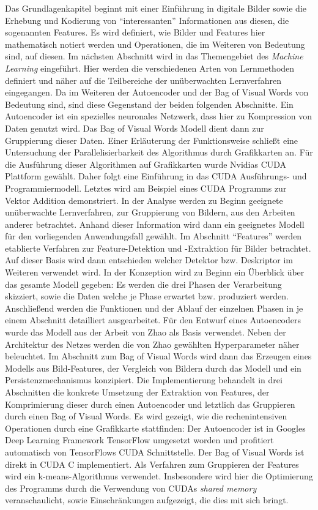 Das Grundlagenkapitel beginnt mit einer Einführung in digitale Bilder sowie die Erhebung und Kodierung von \enquote{interessanten} Informationen aus diesen, die sogenannten Features. Es wird definiert, wie Bilder und Features hier mathematisch notiert werden und Operationen, die im Weiteren von Bedeutung sind, auf diesen.
Im nächsten Abschnitt wird in das Themengebiet des \textit{Machine Learning} eingeführt. Hier werden die verschiedenen Arten von Lernmethoden definiert und näher auf die Teilbereiche der unüberwachten Lernverfahren eingegangen. Da im Weiteren der Autoencoder und der Bag of Visual Words von Bedeutung sind, sind diese Gegenstand der beiden folgenden Abschnitte. Ein Autoencoder ist ein spezielles neuronales Netzwerk, dass hier zu Kompression von Daten genutzt wird. Das Bag of Visual Words Modell dient dann zur Gruppierung dieser Daten. Einer Erläuterung der Funktionsweise schließt eine Untersuchung der Parallelisierbarkeit des Algorithmus durch Grafikkarten an. 
Für die Ausführung dieser Algorithmen auf Grafikkarten wurde Nvidias CUDA Plattform gewählt. Daher folgt eine Einführung in das CUDA Ausführungs- und Programmiermodell. Letztes wird am Beispiel eines CUDA Programms zur Vektor Addition demonstriert.\newline
In der Analyse werden zu Beginn geeignete unüberwachte Lernverfahren, zur Gruppierung von Bildern, aus den Arbeiten anderer betrachtet. Anhand dieser Information wird dann ein geeignetes Modell für den vorliegenden Anwendungsfall gewählt. Im Abschnitt \enquote{Features} werden etablierte Verfahren zur Feature-Detektion und -Extraktion für Bilder betrachtet. Auf dieser Basis wird dann entschieden welcher Detektor bzw. Deskriptor im Weiteren verwendet wird. \newline
In der Konzeption wird zu Beginn ein Überblick über das gesamte Modell gegeben: Es werden die drei Phasen der Verarbeitung skizziert, sowie die Daten welche je Phase erwartet bzw. produziert werden. Anschließend werden die Funktionen und der Ablauf der einzelnen Phasen in je einem Abschnitt detailliert ausgearbeitet. Für den Entwurf eines Autoencoders wurde das Modell aus der Arbeit von Zhao \cite{aed2016} als Basis verwendet. Neben der Architektur des Netzes werden die von Zhao gewählten Hyperparameter näher beleuchtet. Im Abschnitt zum Bag of Visual Words wird dann das Erzeugen eines Modells aus Bild-Features, der Vergleich von Bildern durch das Modell und ein Persistenzmechanismus konzipiert. \newline
Die Implementierung behandelt in drei Abschnitten die konkrete Umsetzung der Extraktion von Features, der Komprimierung dieser durch einen Autoencoder und letztlich das Gruppieren durch einen Bag of Visual Words. Es wird gezeigt, wie die  rechenintensiven Operationen durch eine Grafikkarte stattfinden: Der Autoencoder ist in Googles Deep Learning Framework TensorFlow umgesetzt worden und profitiert automatisch von TensorFlows CUDA Schnittstelle. Der Bag of Visual Words ist direkt in CUDA C implementiert. Als Verfahren zum Gruppieren der Features wird ein k-means-Algorithmus verwendet. Insbesondere wird hier die Optimierung des Programms durch die Verwendung von CUDAs \textit{shared memory} veranschaulicht, sowie Einschränkungen aufgezeigt, die dies mit sich bringt.\newline
